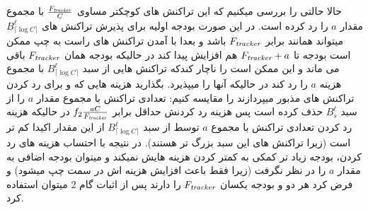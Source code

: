 حالا حالتی را بررسی میکنیم که \off این تراکنش های کوچکتر مساوی
$\frac{F_{\textit{tracker}}}{C}$
با مجموع مقدار
$a$
را رد کرده است. در این صورت بودجه اولیه \off برای پذیرش تراکنش های \bucket
$B_{\lceil\log{C}\rceil}^{\ell}$ 
میتواند همانند \on برابر 
$F_{\textit{tracker}}$
باشد و بعدا با آمدن تراکنش های راست به چپ ممکن است بودجه \off تا
$F_{\textit{tracker}} + a$
هم افزایش پیدا کند در حالیکه بودجه \on همان 
$F_{\textit{tracker}}$ 
باقی می ماند و این ممکن است \on را ناچار کندکه تراکنش هایی از سبد
$B_{\lceil\log{C}\rceil}^{\ell}$ 
با مجموع هزینه
$a$
را رد کند در حالیکه \off آنها را میپذیرد. بگذارید هزینه هایی که \on و \off برای رد کردن تراکنش های مذبور میپردازند را مقایسه کنیم:
\off تعدادی تراکنش با مجموع مقدار
$a$
را از سبد 
$B_{s}^{\ell}$
حذف کرده است پس هزینه رد کردنش حداقل برابر
$f_2\frac{aC}{F_{\textit{tracker}}}$ 
در حالیکه هزینه رد کردن تعدادی تراکنش با مجموع
$a$
 توسط \on از سبد 
$B_{\lceil\log{C}\rceil}^{\ell}$ 
از این مقدار اکیدا کم تر است (زیرا تراکنش های این سبد بزرگ تر هستند). در نتیجه با احتساب هزینه های رد کردن، بودجه زیاد تر \off کمکی به کمتر کردن هزینه هایش نمیکند و میتوان بودجه اضافی \off به مقدار
$a$
را در نظر نگرفت (زیرا فقط باعث افزایش هزینه اش در سمت چپ میشود) و فرض کرد هر دو \on و \off بودجه یکسان
$F_{\textit{tracker}}$
را دارند پس از اثبات گام 2 میتوان استفاده کرد.

